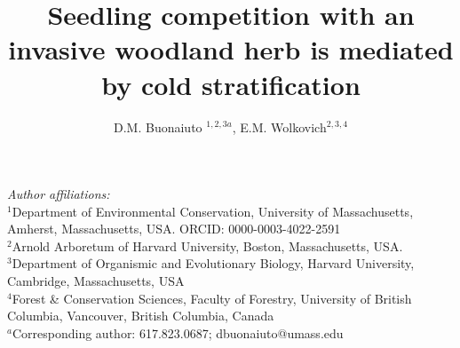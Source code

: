 \documentclass{article}[11pt]
\title{Seedling competition with %
 an invasive %
woodland herb is mediated by cold stratification}
\author{D.M. Buonaiuto $^{1,2,3a}$, E.M. Wolkovich$^{2,3,4}$}
\date{}
\begin{document}

\maketitle
\noindent \emph{Author affiliations:}\\
\noindent $^1$Department of Environmental Conservation, University of Massachusetts, Amherst, Massachusetts, USA. ORCID: 0000-0003-4022-2591\\
\noindent $^2$Arnold Arboretum of Harvard University, Boston, Massachusetts, USA.\\
$^3$Department of Organismic and Evolutionary Biology, Harvard University, Cambridge, Massachusetts, USA \\
$^4$Forest \& Conservation Sciences, Faculty of Forestry, University of British Columbia, Vancouver, British Columbia, Canada\\
$^a$Corresponding author: 617.823.0687; dbuonaiuto@umass.edu\\

\pagebreak
\end{document}
